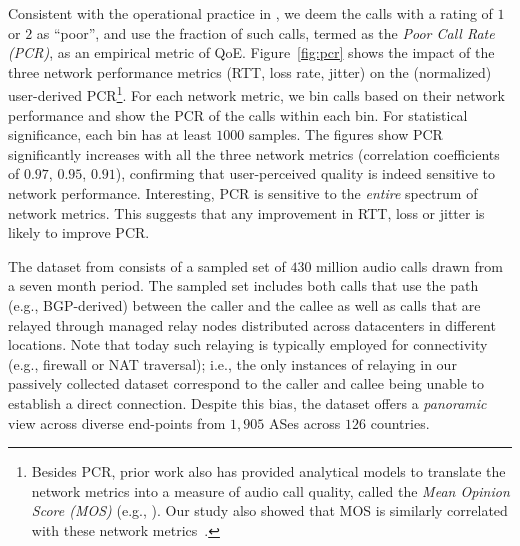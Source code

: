Consistent with the operational practice in \skype, we deem 
the calls with a rating of $1$ or $2$ as ``poor'', and use the 
fraction of such calls, termed as the {\em Poor Call Rate (PCR)}, 
as an empirical metric of QoE. 
Figure~\ref{fig:pcr} shows the impact of the three network 
performance metrics (RTT, loss rate, jitter) on the (normalized)
user-derived PCR\footnote{Besides PCR, 
prior work also has provided analytical models to 
translate the network metrics into a measure of audio call quality, 
called the {\em Mean Opinion Score (MOS)} (e.g., \cite{cole}). 
Our study also showed that MOS is similarly correlated with
these network metrics~\cite{via}.}. 
For each network metric, we bin calls based on their 
network performance and show the PCR of the calls within 
each bin. 
For statistical significance, each bin has at least $1000$ samples. 
The figures show PCR significantly increases with all the three 
network metrics (correlation coefficients of $0.97$, $0.95$, $0.91$), 
confirming that user-perceived quality is indeed sensitive to 
network performance.
Interesting, PCR is sensitive to the {\em entire} spectrum of 
network metrics. This suggests that any improvement in RTT, 
loss or jitter is likely to improve PCR.


The dataset from \skype consists of a sampled set of $430$ 
million audio calls drawn from a seven month period. 
The sampled set includes both calls that use the 
\direct path (e.g., BGP-derived) between the caller 
and the callee %
as well as calls that are relayed through managed 
relay nodes distributed across datacenters in different 
locations. %
Note that today such relaying is typically employed for 
connectivity (e.g., firewall or NAT traversal);
i.e., the only instances of relaying in our passively 
collected dataset correspond to the caller and callee being 
unable to establish a direct connection. 
Despite this bias, the dataset offers a {\em panoramic} view 
across diverse end-points from $1,905$ ASes across $126$ 
countries. 



